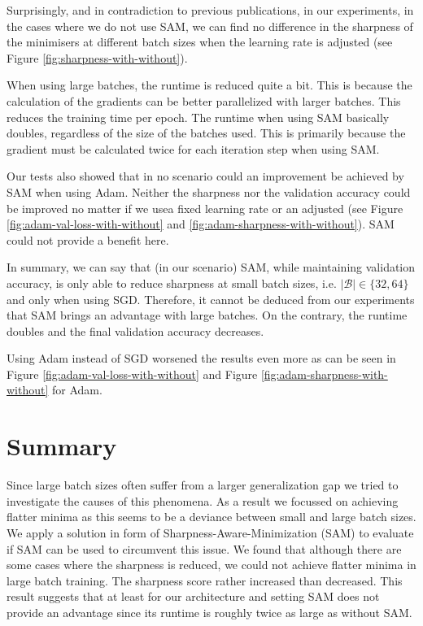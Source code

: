 \documentclass[10pt,conference,compsocconf]{IEEEtran}
\begin{document}
Surprisingly, and in contradiction to previous publications, in our experiments, in the cases where we do not use SAM, we can find no difference in the sharpness of the minimisers at different batch sizes when the learning rate is adjusted (see Figure \ref{fig:sharpness-with-without}).

When using large batches, the runtime is reduced quite a bit. This is because the calculation of the gradients can be better parallelized with larger batches. This reduces the training time per epoch. The runtime when using SAM basically doubles, regardless of the size of the batches used. This is primarily because the gradient must be calculated twice for each iteration step when using SAM.

Our tests also showed that in no scenario could an improvement be achieved by SAM when using Adam. Neither the sharpness nor the validation accuracy could be improved no matter if we usea fixed learning rate or an adjusted (see Figure \ref{fig:adam-val-loss-with-without} and \ref{fig:adam-sharpness-with-without}). SAM could not provide a benefit here.

In summary, we can say that (in our scenario) SAM, while maintaining validation accuracy, is only able to reduce sharpness at small batch sizes, i.e. $|\mathcal{B}| \in \{32, 64\}$ and only when using SGD. Therefore, it cannot be deduced from our experiments that SAM brings an advantage with large batches. On the contrary, the runtime doubles and the final validation accuracy decreases.

Using Adam instead of SGD worsened the results even more as can be seen in Figure \ref{fig:adam-val-loss-with-without} and Figure \ref{fig:adam-sharpness-with-without} for Adam.

\section{Summary}
Since large batch sizes often suffer from a larger generalization gap we tried to investigate the causes of this phenomena. As a result we focussed on achieving flatter minima as this seems to be a deviance between small and large batch sizes. We apply a solution in form of Sharpness-Aware-Minimization (SAM) to evaluate if SAM can be used to circumvent this issue. We found that although there are some cases where the sharpness is reduced, we could not achieve flatter minima in large batch training. The sharpness score rather increased than decreased. This result suggests that at least for our architecture and setting SAM does not provide an advantage since its runtime is roughly twice as large as without SAM.
\end{document}
